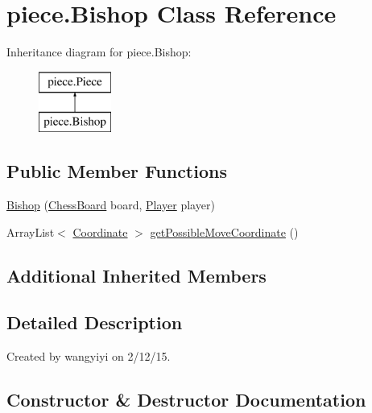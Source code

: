 \hypertarget{classpiece_1_1_bishop}{}\section{piece.\+Bishop Class Reference}
\label{classpiece_1_1_bishop}
Inheritance diagram for piece.\+Bishop\+:\begin{figure}[H]
\begin{center}
\leavevmode
\includegraphics[height=2.000000cm]{classpiece_1_1_bishop}
\end{center}
\end{figure}
\subsection*{Public Member Functions}
\begin{DoxyCompactItemize}
\item 
\hyperlink{classpiece_1_1_bishop_ac48ed9faad6e77272086e3d6bce54244}{Bishop} (\hyperlink{classchess_1_1_chess_board}{Chess\+Board} board, \hyperlink{enumchess_1_1_player}{Player} player)
\item 
Array\+List$<$ \hyperlink{classpiece_1_1_coordinate}{Coordinate} $>$ \hyperlink{classpiece_1_1_bishop_aee0c8f13e3014881bb397a48bfce4ccf}{get\+Possible\+Move\+Coordinate} ()
\end{DoxyCompactItemize}
\subsection*{Additional Inherited Members}


\subsection{Detailed Description}
Created by wangyiyi on 2/12/15. 

\subsection{Constructor \& Destructor Documentation}
\hypertarget{classpiece_1_1_bishop_ac48ed9faad6e77272086e3d6bce54244}{}
